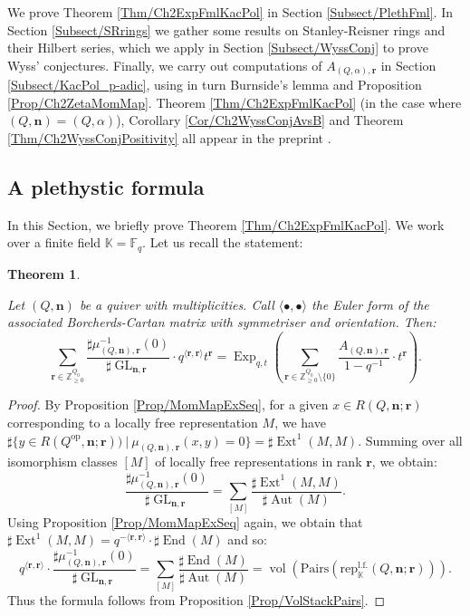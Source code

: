 \documentclass[11pt,english]{article}
\numberwithin{equation}{section}
\numberwithin{figure}{section}
\theoremstyle{definition}
\theoremstyle{plain}
\newtheorem{thm}[df]{Theorem}
\theoremstyle{remark}
\DeclareMathOperator{\End}{End}
\DeclareMathOperator{\Aut}{Aut}
\DeclareMathOperator{\Ext}{Ext}
\DeclareMathOperator{\GL}{GL}
\DeclareMathOperator{\vol}{vol}
\DeclareMathOperator{\Exp}{Exp}
\newcommand\nn{\mathbf{n}}
\newcommand\rr{\mathbf{r}}
\newcommand\ZZ{\mathbb{Z}}
\newcommand\FF{\mathbb{F}}
\newcommand\KK{\mathbb{K}}
\begin{document}
We prove Theorem \ref{Thm/Ch2ExpFmlKacPol} in Section \ref{Subsect/PlethFml}.
In Section \ref{Subsect/SRrings} we gather some results on Stanley-Reisner
rings and their Hilbert series, which we apply in Section \ref{Subsect/WyssConj}
to prove Wyss' conjectures. Finally, we carry out computations of
$A_{(Q,\alpha),\rr}$ in Section \ref{Subsect/KacPol_p-adic}, using
in turn Burnside's lemma and Proposition \ref{Prop/Ch2ZetaMomMap}.
Theorem \ref{Thm/Ch2ExpFmlKacPol} (in the case where $(Q,\nn)=(Q,\alpha)$),
Corollary \ref{Cor/Ch2WyssConjAvsB} and Theorem \ref{Thm/Ch2WyssConjPositivity}
all appear in the preprint \cite{Ver23}.

\subsection{A plethystic formula \label{Subsect/PlethFml}}

In this Section, we briefly prove Theorem \ref{Thm/Ch2ExpFmlKacPol}.
We work over a finite field $\KK=\FF_{q}$. Let us recall the statement:

\begin{thm} \label{Thm/ExpFmlKacPol}

Let $(Q,\nn)$ be a quiver with multiplicities. Call $\langle\bullet,\bullet\rangle$
the Euler form of the associated Borcherds-Cartan matrix with symmetriser
and orientation. Then: \[
\sum_{\rr\in\ZZ_{\geq0}^{Q_0}}
\frac{\sharp\mu_{(Q,\nn),\rr}^{-1}(0)}{\sharp\GL_{\nn,\rr}}
\cdot q^{\langle\rr,\rr\rangle}t^{\rr}
=
\Exp_{q,t}\left(
\sum_{\rr\in\ZZ_{\geq0}^{Q_0}\setminus\{0\}}
\frac{A_{(Q,\nn),\rr}}{1-q^{-1}}\cdot t^{\rr}
\right).
\]

\end{thm}

\begin{proof}

By Proposition \ref{Prop/MomMapExSeq}, for a given $x\in R(Q,\nn;\rr)$
corresponding to a locally free representation $M$, we have $\sharp\{y\in R(Q^{\mathrm{op}},\nn;\rr))\ \vert\ \mu_{(Q,\nn),\rr}(x,y)=0\}=\sharp\Ext^{1}(M,M)$.
Summing over all isomorphism classes $[M]$ of locally free representations
in rank $\rr$, we obtain:\[
\frac{\sharp\mu_{(Q,\nn),\rr}^{-1}(0)}{\sharp\GL_{\nn,\rr}}
=
\sum_{[M]}\frac{\sharp\Ext^{1}(M,M)}{\sharp\Aut(M)}.
\] Using Proposition \ref{Prop/MomMapExSeq} again, we obtain that $\sharp\Ext^{1}(M,M)=q^{-\langle\rr,\rr\rangle}\cdot\sharp\End(M)$
and so:\[
q^{\langle\rr,\rr\rangle}\cdot\frac{\sharp\mu_{(Q,\nn),\rr}^{-1}(0)}{\sharp\GL_{\nn,\rr}}
=
\sum_{[M]}\frac{\sharp\End(M)}{\sharp\Aut(M)}=\vol (\mathrm{Pairs}(\mathrm{rep}_{\KK}^{\mathrm{l.f.}}(Q,\nn;\rr))).
\] Thus the formula follows from Proposition \ref{Prop/VolStackPairs}.
\end{proof}
\end{document}
